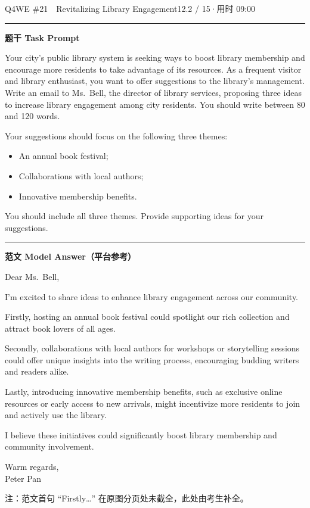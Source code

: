 \documentclass[11pt]{article}
\newcommand{\ptesub}[1]{%
  \par\needspace{2\baselineskip}\smallskip
  {\color{cAccent}\rule[-0.2ex]{3pt}{1.05em}}\hspace{6pt}%
  {\bfseries\color{cHead}#1}\par\nopagebreak\smallskip}
\begin{document}
\begin{qblock}{Q4\quad WE \#21\ \ Revitalizing Library Engagement}{12.2 / 15\quad·\quad 用时 09:00}

\ptesub{题干 Task Prompt}
\begin{promptbox}
Your city's public library system is seeking ways to boost library membership and encourage more residents to take advantage of its resources. As a frequent visitor and library enthusiast, you want to offer suggestions to the library's management. Write an email to Ms.\ Bell, the director of library services, proposing three ideas to increase library engagement among city residents. You should write between 80 and 120 words.

\smallskip Your suggestions should focus on the following three themes:
\begin{itemize}[leftmargin=1.4em,topsep=2pt,itemsep=0pt]
  \item An annual book festival;
  \item Collaborations with local authors;
  \item Innovative membership benefits.
\end{itemize}
You should include all three themes. Provide supporting ideas for your suggestions.
\end{promptbox}

\ptesub{范文 Model Answer（平台参考）}
\begin{modelbox}
Dear Ms.\ Bell,

I'm excited to share ideas to enhance library engagement across our community.

Firstly, hosting an annual book festival could spotlight our rich collection and attract book lovers of all ages.

Secondly, collaborations with local authors for workshops or storytelling sessions could offer unique insights into the writing process, encouraging budding writers and readers alike.

Lastly, introducing innovative membership benefits, such as exclusive online resources or early access to new arrivals, might incentivize more residents to join and actively use the library.

I believe these initiatives could significantly boost library membership and community involvement.

Warm regards,\\ Peter Pan
\end{modelbox}
{\footnotesize\color{gray} 注：范文首句 “Firstly…” 在原图分页处未截全，此处由考生补全。}


\end{qblock}
\end{document}

